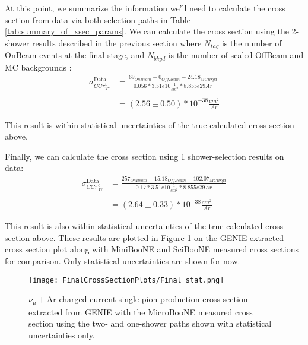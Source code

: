 \par At this point, we summarize the information we'll need to calculate the cross section from data via both selection paths in Table \ref{tab:summary_of_xsec_params}. We can calculate the cross section using the 2-shower results described in the previous section where $N_{tag}$ is the number of OnBeam events at the final stage, and $N_{bkgd}$ is the number of scaled OffBeam and MC backgrounds :
\begin{align}
\sigma^{\text{Data}}_{CC\pi^0_{2\gamma}} &= \frac{69_{OnBeam} - 0_{OffBeam} - 24.18_{MCBkgd}}{0.056 * 3.51e10 \frac{1}{cm^2} * 8.855e29 Ar} \\\\
&= (2.56 \pm 0.50) *10^{-38} \frac{cm^2}{Ar}
\end{align}

This result is within statistical uncertainties of the true calculated cross section above. 

\par Finally, we can calculate the cross section using 1 shower-selection results on data:
\begin{align}
\sigma^{\text{Data}}_{CC\pi^0_{1\gamma}} &= \frac{257_{OnBeam} - 15.18_{OffBeam} - 102.07_{MCBkgd}}{0.17 * 3.51e10 \frac{1}{cm^2} * 8.855e29 Ar} \\\\
&= (2.64 \pm 0.33) *10^{-38} \frac{cm^2}{Ar}
\end{align}

This result is also within statistical uncertainties of the true calculated cross section above. These results are plotted in Figure \ref{fig:genie_uboone_xsec} on the GENIE extracted cross section plot along with MiniBooNE and SciBooNE measured cross sections for comparison.  Only statistical uncertainties are shown for now.

\begin{figure}[h!]
\centering
\texttt{[image: FinalCrossSectionPlots/Final\_stat.png]}
\caption{ $\nu_{\mu}+\text{Ar}$ charged current single pion production cross section extracted from GENIE with the MicroBooNE measured cross section using the two- and one-shower paths shown with statistical uncertainties only. }
\label{fig:genie_uboone_xsec}
\end{figure}

\clearpage

